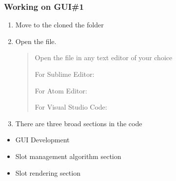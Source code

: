 \documentclass[letterpaper,10pt,english]{sphinxmanual}
\begin{document}
\subsubsection{Working on GUI\#1}
\label{\detokenize{developer:working-on-gui-1}}\begin{enumerate}
%
\item {} 
Move to the cloned the folder
\begin{quote}

\begin{sphinxVerbatim}[commandchars=\\\{\}]
 
\end{sphinxVerbatim}
\end{quote}

\item {} 
Open the  file.
\begin{quote}

Open the  file in any text editor of your choice

For Sublime Editor:

\begin{sphinxVerbatim}[commandchars=\\\{\}]
 
\end{sphinxVerbatim}

For Atom Editor:

\begin{sphinxVerbatim}[commandchars=\\\{\}]
 
\end{sphinxVerbatim}

For Visual Studio Code:

\begin{sphinxVerbatim}[commandchars=\\\{\}]
 
\end{sphinxVerbatim}
\end{quote}

\item {} 
There are three broad sections in the code

\end{enumerate}
\begin{itemize}
\item {} 
GUI Development

\item {} 
Slot management algorithm section

\item {} 
Slot rendering section

\end{itemize}
\end{document}
